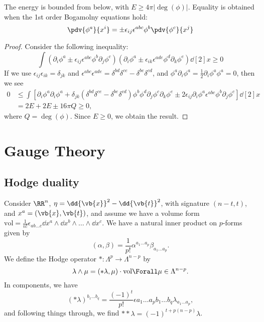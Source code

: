 \documentclass{jknotes}
\begin{document}
\begin{lemma}
    The energy is bounded from below, with \(E\ge 4\pi|\deg(\phi)|\). Equality is obtained when the 1st order Bogamolny equations hold:
    \begin{equation}
        \pdv{\phi^a}{x^i} = \pm\epsilon_{ij}\epsilon^{abc}\phi^b\pdv{\phi^c}{x^j}
    \end{equation}
\end{lemma}
\begin{proof}
    Consider the following inequality:
    \begin{equation}
        \int 
        \left( \partial_i\phi^a \pm \epsilon_{ij}\epsilon^{abc}\phi^b\partial_j\phi^c \right)
        \left( \partial_i\phi^a \pm \epsilon_{ik}\epsilon^{ade}\phi^d\partial_k\phi^e \right)
        \dd[2]{x} \ge 0
    \end{equation}
    If we use \(\epsilon_{ij}\epsilon_{ik} = \delta_{jk}\) and \(\epsilon^{abc}\epsilon^{ade}=\delta^{bd}\delta^{ce} - \delta^{be}\delta^{cd}\), and \(\phi^a\partial_i\phi^a = \frac{1}{2} \partial_i\phi^a\phi^a = 0\), then we see
    \begin{align}
        0 &\le \int\left[ \partial_i\phi^a\partial_i\phi^a + \delta_{jk}(\delta^{bd}\delta^{ce}-\delta^{be}\delta^{cd})\phi^b\phi^d\partial_j\phi^c\partial_k\phi^e \pm 2\epsilon_{ij}\partial_i\phi^a\epsilon^{abc}\phi^b\partial_j\phi^c\right] \dd[2]{x}\\
          & = 2E + 2E \pm 16\pi Q \ge 0,
    \end{align}
    where \(Q = \deg(\phi)\). Since \(E\ge0\), we obtain the result.
\end{proof}

\section{Gauge Theory}
\subsection{Hodge duality}
Consider \(\RR^n\), \(\eta=\dd{\vb{x}}^2-\dd{\vb{t}}^2\), with signature \((n-t,t)\), and \(x^a = (\vb{x},\vb{t})\), and assume we have a volume form \(\mathrm{vol} = \frac{1}{n!}\epsilon_{ab\dots c}\dd{x^a}\wedge\dd{x^b}\wedge\dots\wedge\dd{x^c}\). We have a natural inner product on \(p\)-forms given by
\begin{equation}
    (\alpha,\beta) = \frac{1}{p!} \alpha^{a_1\dots a_p}\beta_{a_1\dots a_p}.
\end{equation}
We define the Hodge operator \(*:\Lambda^p\to\Lambda^{n-p}\) by 
\begin{equation}
    \lambda\wedge\mu = (*\lambda,\mu)\cdot \mathrm{vol} \Forall \mu \in \Lambda^{n-p}.
\end{equation}
In components, we have
\begin{equation}
    (*\lambda)^{b_1\dots b_q} = \frac{(-1)^t}{p!}\epsilon{a_1\dots a_p b_1\dots b_q} \lambda_{a_1\dots a_p},
\end{equation}
and following things through, we find \(**\lambda = (-1)^{t+p(n-p)}\lambda\).
\end{document}
